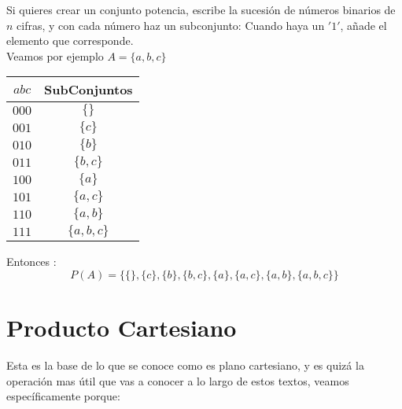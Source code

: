 \documentclass[12pt, fleqn]{report}                             %
\begin{document}
                Si quieres crear un conjunto potencia, escribe la sucesión de números binarios de $n$ cifras,
                y con cada número haz un subconjunto: Cuando haya un $'1'$, añade el elemento que corresponde.\\

                Veamos por ejemplo $A = \{a, b, c\}$ \\


                \begin{tabular}{c | c  }
                   $a b c$ & SubConjuntos       \\
                   \midrule
                  
                   $0 0 0$ &  $\{ \}$           \\
                   $0 0 1$ &  $\{ c \}$         \\
                   $0 1 0$ &  $\{ b \}$         \\
                   $0 1 1$ &  $\{ b, c \}$      \\
                   $1 0 0$ &  $\{ a \}$         \\
                   $1 0 1$ &  $\{ a, c \}$      \\
                   $1 1 0$ &  $\{ a, b \}$      \\
                   $1 1 1$ &  $\{ a, b, c \}$   \\
                 
                \end{tabular}

                Entonces : 
                \begin{equation*}
                    P(A) = 
                    \{
                        \{ \}, \{ c \}, \{ b \}, \{ b, c \}, 
                        \{ a \}, \{ a, c \}, \{ a, b \}, \{ a, b, c \}
                    \}
                \end{equation*}





        \clearpage
        \section{Producto Cartesiano}

            Esta es la base de lo que se conoce como es plano cartesiano, y es quizá
            la operación mas útil que vas a conocer a lo largo de estos textos,
            veamos específicamente porque:
\end{document}

